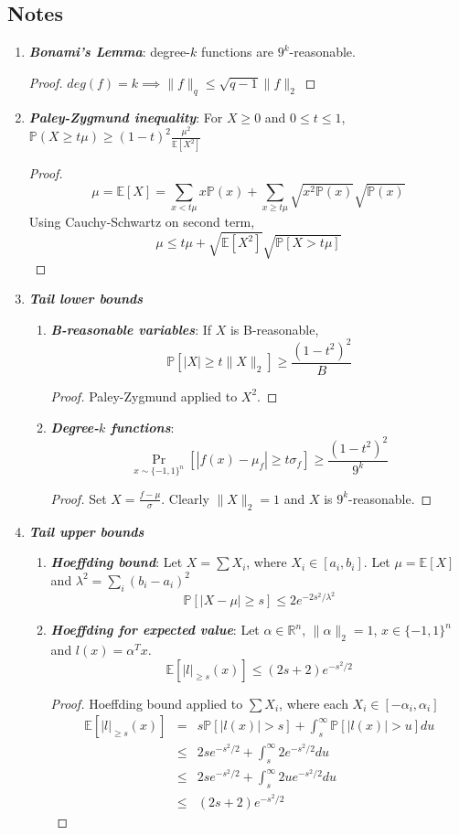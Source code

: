 \documentclass{sig-alternate}
\begin{document}
\subsection{Notes}
\begin{enumerate}
\item \textbf{\textit{Bonami's Lemma}}: degree-$k$ functions are $9^k$-reasonable.\begin{proof}
$ deg(f) = k \implies \|f\|_q \leq \sqrt{q-1}\|f\|_2 $
\end{proof}
\item \textit{\textbf{Paley-Zygmund inequality}}: For $X \geq 0$ and $0\leq t \leq 1$, $\mathbb{P}(X \geq t\mu) \geq (1-t)^2\frac{\mu^2}{\mathbb{E}[X^2]}$
\begin{proof}
\[\mu = \mathbb{E}[X] = \sum_{x < t\mu}x\mathbb{P}(x) + \sum_{x\geq t\mu}\sqrt{x^2\mathbb{P}(x)}
\sqrt{\mathbb{P}(x)}\]
Using Cauchy-Schwartz on second term,
\[\mu \leq t\mu + \sqrt{\mathbb{E}[X^2]}\sqrt{\mathbb{P}[X > t\mu]} \]
\end{proof}
\item\textit{\textbf{Tail lower bounds}}
      \begin{enumerate}
 	\item \textit{\textbf{B-reasonable variables}}: If $X$ is B-reasonable,
\[\mathbb{P}[|X| \geq t\|X\|_2] \geq \frac{(1-t^2)^2}{B} \]
\begin{proof}
Paley-Zygmund applied to $X^2$.
\end{proof}
	\item \textit{\textbf{Degree-$k$ functions}}:
\[ \Pr_{x \sim \{-1, 1\}^n}[|f(x) - \mu_f| \geq t\sigma_f]  \geq \frac{(1 - t^2)^2}{9^k} \]
	\begin{proof}
	Set $X = \frac{f - \mu}{\sigma}$. Clearly $\|X\|_2 = 1$ and $X$ is $9^k$-reasonable.
	\end{proof}
	\end{enumerate}
\item\textit{\textbf{Tail upper bounds}}
\begin{enumerate}
\item \textit{\textbf{Hoeffding bound}}: Let $X = \sum X_i$, where $X_i \in [a_i, b_i]$.  Let $\mu = \mathbb{E}[X]$ and $\lambda^2 = \sum_i(b_i - a_i)^2$
\[ \mathbb{P}[|X - \mu| \geq s] \leq 2e^{-2s^2/\lambda^2} \]
\item \textit{\textbf{Hoeffding for expected value}}: Let $\alpha \in \mathbb{R}^n$, $\|\alpha\|_2 = 1$, $x \in \{-1,1\}^n$ and $l(x) = \alpha^Tx$.
\[ \mathbb{E}[|l|_{\geq s}(x)] \leq (2s + 2)e^{-s^2/2}\]
\begin{proof}
Hoeffding bound applied to $\sum X_i$, where each $X_i \in [-\alpha_i, \alpha_i]$
\begin{eqnarray*}
\mathbb{E}[|l|_{\geq s}(x)] & = & s\mathbb{P}[|l(x)| > s] + \int_s^{\infty}\mathbb{P}[|l(x)| > u]du \\
 & \leq & 2se^{-s^2/2} + \int_s^{\infty}2e^{-s^2/2}du \\
 & \leq & 2se^{-s^2/2} + \int_s^{\infty}2ue^{-s^2/2}du \\
 & \leq & (2s + 2)e^{-s^2/2}
\end{eqnarray*}
\end{proof}
\end{enumerate}
\end{enumerate}
\end{document}
